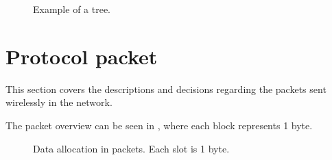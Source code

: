 \begin{figure}[!h]
	\centering
	\caption{Example of a tree.}
	\label{fig:prottree1}
\end{figure}


\section{Protocol packet}
This section covers the descriptions and decisions regarding the packets sent wirelessly in the network.

The packet overview can be seen in , where each block represents 1 byte.
\begin{figure}[h!]
	\centering
	\caption{Data allocation in packets. Each slot is 1 byte.}
	\label{fig:dataalloc}
\end{figure}


